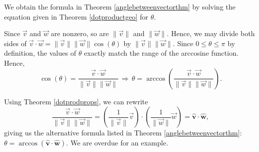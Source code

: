 \documentclass{ximera}
\begin{document}

\smallskip

We obtain the formula in Theorem \ref{anglebetweenvectorthm} by solving the equation given in Theorem \ref{dotproductgeo} for $\theta$.  

\smallskip

Since $\vec{v}$ and $\vec{w}$ are nonzero, so are $\| \vec{v} \|$ and $\|\vec{w}\|$.  Hence, we may divide both sides of $\vec{v} \cdot \vec{w} = \| \vec{v} \| \|\vec{w} \| \cos(\theta)$ by $\| \vec{v} \| \|\vec{w} \|$.  Since $0 \leq \theta \leq \pi$ by definition, the values of $\theta$ exactly match the range of the arccosine function.  Hence,  \[ \cos(\theta) = \frac{\vec{v} \cdot \vec{w}}{\| \vec{v} \| \|\vec{w} \|} \, \Rightarrow \,  \theta = \arccos\left( \frac{\vec{v} \cdot \vec{w}}{\| \vec{v} \| \|\vec{w} \|}\right).\]

\smallskip

Using Theorem \ref{dotprodprops}, we can rewrite \[ \frac{\vec{v} \cdot \vec{w}}{\| \vec{v} \| \|\vec{w} \|} = \left(\frac{1}{\|\vec{v}\|} \vec{v}\right) \cdot \left(\frac{1}{\|\vec{w}\|} \vec{w}\right) = \bm\hat{v} \cdot \bm\hat{w},\]  giving us the alternative formula listed in Theorem \ref{anglebetweenvectorthm}:  $\theta = \arccos(\bm\hat{v} \cdot \bm\hat{w})$.    We are overdue for an example.

\smallskip
\end{document}
